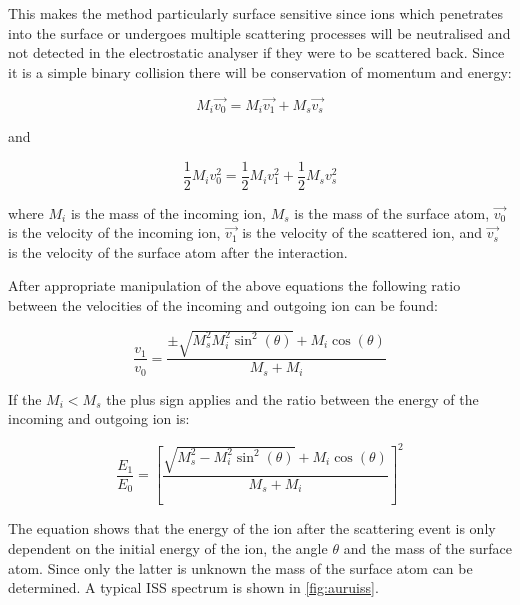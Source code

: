 This makes the method particularly surface sensitive since ions which penetrates into the surface or undergoes multiple scattering processes will be neutralised and not detected in the electrostatic analyser if they were to be scattered back. Since it is a simple binary collision there will be conservation of momentum and energy:

\begin{equation}
M_i\vec{v_0}=M_i\vec{v_1}+M_s\vec{v_s}
\end{equation}

\noindent and
 
\begin{equation}
\frac{1}{2}M_iv_0^2=\frac{1}{2}M_iv_1^2+\frac{1}{2}M_sv_s^2
\end{equation}

\noindent where $M_i$ is the mass of the incoming ion, $M_s$ is the mass of the surface atom, $\vec{v_0}$ is the velocity of the incoming ion, $\vec{v_1}$ is the velocity of the scattered ion, and $\vec{v_s}$ is the velocity of the surface atom after the interaction.

After appropriate manipulation of the above equations the following ratio between the velocities of the incoming and outgoing ion can be found:

\begin{equation}
\frac{v_1}{v_0}=\frac{\pm\sqrt{M_s^2M_i^2\sin^2(\theta)}+M_i\cos(\theta)}{M_s+M_i}
\end{equation}

If the $M_i<M_s$ the plus sign applies and the ratio between the energy of the incoming and outgoing ion is:

\begin{equation}
\frac{E_1}{E_0}=\left[\frac{\sqrt{M_s^2-M_i^2\sin^2(\theta)}+M_i\cos(\theta)}{M_s+M_i}\right]^2
\end{equation}

The equation shows that the energy of the ion after the scattering event is only dependent on the initial energy of the ion, the angle $\theta$ and the mass of the surface atom. Since only the latter is unknown the mass of the surface atom can be determined. A typical ISS spectrum is shown in \autoref{fig:auruiss}.

